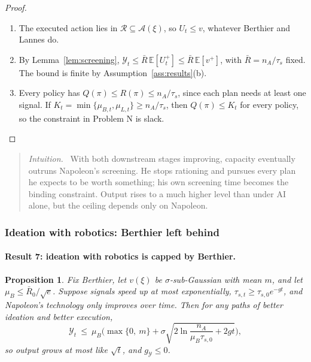 \documentclass[11pt]{article}
\newcommand{\Nap}{\textcolor{nap}{Napoleon}}
\newcommand{\Ber}{\textcolor{ber}{Berthier}}
\newcommand{\Lan}{\textcolor{lan}{Lannes}}
\newtheorem{proposition}{Proposition}
\theoremstyle{remark}
\newenvironment{intuition}{\begin{quote}\small\color{muted}\textit{Intuition.}\ }{\end{quote}}
\newcommand{\E}{\mathbb{E}}
\newcommand{\Ycal}{\mathcal{Y}}
\newcommand{\Rcal}{\mathcal{R}}
\newcommand{\Acal}{\mathcal{A}}
\begin{document}
\begin{proof}
\begin{enumerate}
  \item The executed action lies in $\Rcal\subseteq\Acal(\xi)$, so $U_t\le v$, whatever \Ber{} and \Lan{} do.
  \item By Lemma~\ref{lem:screening}, $\Ycal_t\le\bar R\,\E[U_t^+]\le\bar R\,\E[v^+]$, with $\bar R=n_A/\tau_s$ fixed. The bound is finite by Assumption~\ref{ass:results}(b).
  \item Every policy has $Q(\pi)\le R(\pi)\le n_A/\tau_s$, since each plan needs at least one signal. If $K_t=\min\{\mu_{B,t},\mu_{L,t}\}\ge n_A/\tau_s$, then $Q(\pi)\le K_t$ for every policy, so the constraint in Problem N is slack. \qedhere
\end{enumerate}
\end{proof}

\begin{intuition}
With both downstream stages improving, capacity eventually outruns \Nap's screening. He stops rationing and pursues every plan he expects to be worth something; his own screening time becomes the binding constraint. Output rises to a much higher level than under AI alone, but the ceiling depends only on \Nap.
\end{intuition}

\subsubsection{Ideation with robotics: \texorpdfstring{\Ber}{Berthier} left behind}

\paragraph{Result 7: ideation with robotics is capped by \Ber.}

\begin{proposition}\label{prop:ideationrobotics}
Fix \Ber, let $v(\xi)$ be $\sigma$-sub-Gaussian with mean $m$, and let $\mu_B\le\bar R_0/\sqrt e$. Suppose signals speed up at most exponentially, $\tau_{s,t}\ge\tau_{s,0}e^{-gt}$, and \Nap's technology only improves over time. Then for any paths of better ideation and better execution,
\[
\Ycal_t\ \le\ \mu_B\bigg(\max\{0,\ m\}+\sigma\sqrt{2\ln\frac{n_A}{\mu_B\tau_{s,0}}+2gt}\bigg),
\]
so output grows at most like $\sqrt t$, and $g_{\Ycal}\le0$.
\end{proposition}
\end{document}
